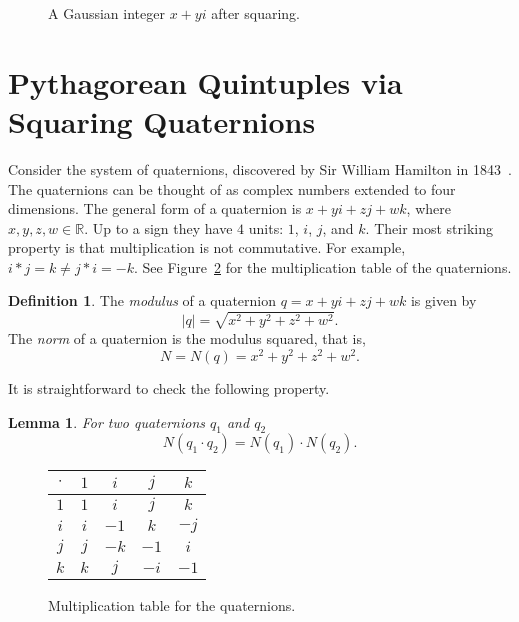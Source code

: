 \documentclass[12pt,table]{article}
\newtheorem{lemma}[theorem]{Lemma}
\theoremstyle{definition}
\newtheorem{definition}[theorem]{Definition}
\theoremstyle{remark}
\newcommand{\Rrr}{\mathbb R}
\numberwithin{equation}{section}
\begin{document}
\begin{figure}
\begin{center}
\end{center}
\caption{A Gaussian integer $x+yi$ after squaring.}
\label{figure_Pythagorean_squared}
\end{figure}

\section{Pythagorean Quintuples via Squaring Quaternions}


Consider the system of quaternions, discovered by Sir William Hamilton 
in 1843~\cite{Hamilton}.
The quaternions can be thought
of as complex numbers extended to four dimensions.
The general
 form of a quaternion is $x+yi+zj+wk$,
where $x, y, z, w \in \Rrr$.
Up to a sign they have $4$ units: $1$, $i$, $j$, and $k$. Their most striking
property is that multiplication is not commutative. 
For example, $i*j = k \neq j*i = -k$.
See Figure~\ref{figure_multiplication_table} 
for the multiplication table of the
quaternions.


\begin{definition}
The {\em modulus} 
of a quaternion
$q =  x+yi+zj+wk$
is given by 
\[
   |q| = \sqrt{x^2 + y^2 + z^2 + w^2}.
\]
The {\em norm} of a quaternion is the modulus squared, that is,
\[
     N =  N(q) = x^2 + y^2 + z^2 + w^2.
\]
\end{definition}


It is straightforward to check the following property.
\begin{lemma}
\label{lemma_norm_multiplicative}
For two quaternions $q_1$ and $q_2$
\[
     N(q_1 \cdot q_2) = N(q_1) \cdot N(q_2).
\]
\end{lemma}



\begin{figure}
\begin{center}
\begin{tabular}{c||c|c|c|c}
$\cdot$ & $1$ & $i$ & $j$ & $k$ \\
\hline
\hline
$1$ & $1$ & $i$ & $j$ & $k$ \\
\hline
$i$ & $i$ & $-1$ & $k$ & $-j$\\
\hline
$j$ & $j$ & $-k$ & $-1$ & $i$ \\
\hline
$k$ & $k$ & $j$ & $-i$ & $-1$
\end{tabular}
\end{center}
\caption{Multiplication table for the quaternions.}
\label{figure_multiplication_table}
\end{figure}
\end{document}
